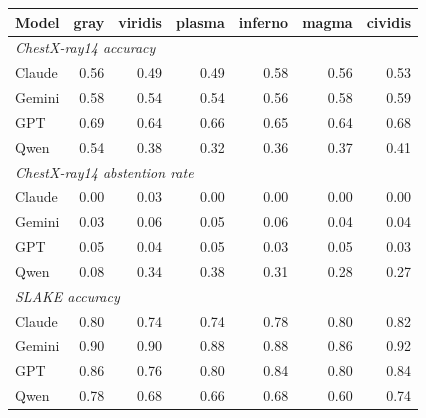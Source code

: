 \begin{tabular}{lrrrrrr}
\toprule
Model & gray & viridis & plasma & inferno & magma & cividis \\
\midrule
\multicolumn{7}{l}{\emph{ChestX-ray14 accuracy}} \\
Claude & 0.56 & 0.49 & 0.49 & 0.58 & 0.56 & 0.53 \\
Gemini & 0.58 & 0.54 & 0.54 & 0.56 & 0.58 & 0.59 \\
GPT & 0.69 & 0.64 & 0.66 & 0.65 & 0.64 & 0.68 \\
Qwen & 0.54 & 0.38 & 0.32 & 0.36 & 0.37 & 0.41 \\
\midrule
\multicolumn{7}{l}{\emph{ChestX-ray14 abstention rate}} \\
Claude & 0.00 & 0.03 & 0.00 & 0.00 & 0.00 & 0.00 \\
Gemini & 0.03 & 0.06 & 0.05 & 0.06 & 0.04 & 0.04 \\
GPT & 0.05 & 0.04 & 0.05 & 0.03 & 0.05 & 0.03 \\
Qwen & 0.08 & 0.34 & 0.38 & 0.31 & 0.28 & 0.27 \\
\midrule
\multicolumn{7}{l}{\emph{SLAKE accuracy}} \\
Claude & 0.80 & 0.74 & 0.74 & 0.78 & 0.80 & 0.82 \\
Gemini & 0.90 & 0.90 & 0.88 & 0.88 & 0.86 & 0.92 \\
GPT & 0.86 & 0.76 & 0.80 & 0.84 & 0.80 & 0.84 \\
Qwen & 0.78 & 0.68 & 0.66 & 0.68 & 0.60 & 0.74 \\
\bottomrule
\end{tabular}
